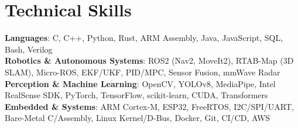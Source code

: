 \documentclass[letterpaper,10pt]{article}
\begin{document}
\section{Technical Skills}
 \begin{itemize}[leftmargin=0.12in, label={}, itemsep=0.5pt, parsep=0pt, topsep=0.5pt]
  \small{\item{
    \textbf{Languages}{: C, C++, Python, Rust, ARM Assembly, Java, JavaScript, SQL, Bash, Verilog} \\
    \textbf{Robotics \& Autonomous Systems}{: ROS2 (Nav2, MoveIt2), RTAB-Map (3D SLAM), Micro-ROS, EKF/UKF, PID/MPC, Sensor Fusion, mmWave Radar} \\
    \textbf{Perception \& Machine Learning}{: OpenCV, YOLOv8, MediaPipe, Intel RealSense SDK, PyTorch, TensorFlow, scikit-learn, CUDA, Transformers} \\
    \textbf{Embedded \& Systems}{: ARM Cortex-M, ESP32, FreeRTOS, I2C/SPI/UART, Bare-Metal C/Assembly, Linux Kernel/D-Bus, Docker, Git, CI/CD, AWS}
  }}
 \end{itemize}

\end{document}
